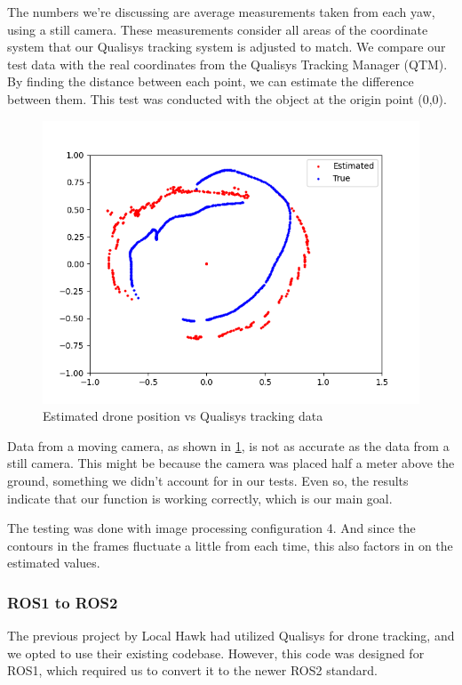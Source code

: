 The numbers we're discussing are average measurements taken from each yaw, using a still camera. These measurements consider all areas of the coordinate system that our Qualisys tracking system is adjusted to match. We compare our test data with the real coordinates from the Qualisys Tracking Manager (QTM). By finding the distance between each point, we can estimate the difference between them. This test was conducted with the object at the origin point (0,0).

\begin{figure}[!h]
    \centering
    \includegraphics[scale=0.5]{sindrebilder/plotDronefinal.png}
    \caption{Estimated drone position vs Qualisys tracking data}
    \label{fig:qssPlot}
\end{figure}

Data from a moving camera, as shown in \ref{fig:qssPlot}, is not as accurate as the data from a still camera. This might be because the camera was placed half a meter above the ground, something we didn't account for in our tests. Even so, the results indicate that our function is working correctly, which is our main goal.

The testing was done with image processing configuration 4. And since the contours in the frames fluctuate a little from each time, this also factors in on the estimated values. 
\newpage

\subsubsection{ROS1 to ROS2}

The previous project by Local Hawk had utilized Qualisys for drone tracking, and we opted to use their existing codebase. However, this code was designed for ROS1, which required us to convert it to the newer ROS2 standard.

